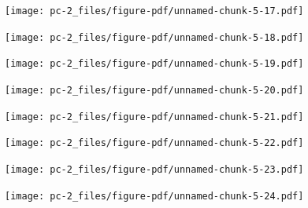 \documentclass[
  letterpaper,
  DIV=11,
  numbers=noendperiod]{scrreprt}
\begin{document}
\begin{figure}[H]

{\centering \texttt{[image: pc-2\_files/figure-pdf/unnamed-chunk-5-17.pdf]}

}

\end{figure}

\begin{figure}[H]

{\centering \texttt{[image: pc-2\_files/figure-pdf/unnamed-chunk-5-18.pdf]}

}

\end{figure}

\begin{figure}[H]

{\centering \texttt{[image: pc-2\_files/figure-pdf/unnamed-chunk-5-19.pdf]}

}

\end{figure}

\begin{figure}[H]

{\centering \texttt{[image: pc-2\_files/figure-pdf/unnamed-chunk-5-20.pdf]}

}

\end{figure}

\begin{figure}[H]

{\centering \texttt{[image: pc-2\_files/figure-pdf/unnamed-chunk-5-21.pdf]}

}

\end{figure}

\begin{figure}[H]

{\centering \texttt{[image: pc-2\_files/figure-pdf/unnamed-chunk-5-22.pdf]}

}

\end{figure}

\begin{figure}[H]

{\centering \texttt{[image: pc-2\_files/figure-pdf/unnamed-chunk-5-23.pdf]}

}

\end{figure}

\begin{figure}[H]

{\centering \texttt{[image: pc-2\_files/figure-pdf/unnamed-chunk-5-24.pdf]}

}

\end{figure}
\end{document}
